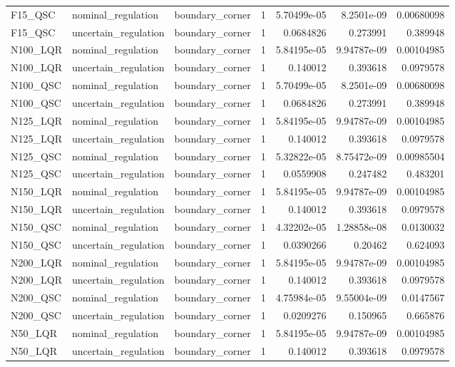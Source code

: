 \begin{tabular}{llllrrr}
F15\_QSC & nominal\_regulation & boundary\_corner & 1 & 5.70499e-05 & 8.2501e-09 & 0.00680098 \\
F15\_QSC & uncertain\_regulation & boundary\_corner & 1 & 0.0684826 & 0.273991 & 0.389948 \\
N100\_LQR & nominal\_regulation & boundary\_corner & 1 & 5.84195e-05 & 9.94787e-09 & 0.00104985 \\
N100\_LQR & uncertain\_regulation & boundary\_corner & 1 & 0.140012 & 0.393618 & 0.0979578 \\
N100\_QSC & nominal\_regulation & boundary\_corner & 1 & 5.70499e-05 & 8.2501e-09 & 0.00680098 \\
N100\_QSC & uncertain\_regulation & boundary\_corner & 1 & 0.0684826 & 0.273991 & 0.389948 \\
N125\_LQR & nominal\_regulation & boundary\_corner & 1 & 5.84195e-05 & 9.94787e-09 & 0.00104985 \\
N125\_LQR & uncertain\_regulation & boundary\_corner & 1 & 0.140012 & 0.393618 & 0.0979578 \\
N125\_QSC & nominal\_regulation & boundary\_corner & 1 & 5.32822e-05 & 8.75472e-09 & 0.00985504 \\
N125\_QSC & uncertain\_regulation & boundary\_corner & 1 & 0.0559908 & 0.247482 & 0.483201 \\
N150\_LQR & nominal\_regulation & boundary\_corner & 1 & 5.84195e-05 & 9.94787e-09 & 0.00104985 \\
N150\_LQR & uncertain\_regulation & boundary\_corner & 1 & 0.140012 & 0.393618 & 0.0979578 \\
N150\_QSC & nominal\_regulation & boundary\_corner & 1 & 4.32202e-05 & 1.28858e-08 & 0.0130032 \\
N150\_QSC & uncertain\_regulation & boundary\_corner & 1 & 0.0390266 & 0.20462 & 0.624093 \\
N200\_LQR & nominal\_regulation & boundary\_corner & 1 & 5.84195e-05 & 9.94787e-09 & 0.00104985 \\
N200\_LQR & uncertain\_regulation & boundary\_corner & 1 & 0.140012 & 0.393618 & 0.0979578 \\
N200\_QSC & nominal\_regulation & boundary\_corner & 1 & 4.75984e-05 & 9.55004e-09 & 0.0147567 \\
N200\_QSC & uncertain\_regulation & boundary\_corner & 1 & 0.0209276 & 0.150965 & 0.665876 \\
N50\_LQR & nominal\_regulation & boundary\_corner & 1 & 5.84195e-05 & 9.94787e-09 & 0.00104985 \\
N50\_LQR & uncertain\_regulation & boundary\_corner & 1 & 0.140012 & 0.393618 & 0.0979578 \\

\end{tabular}
